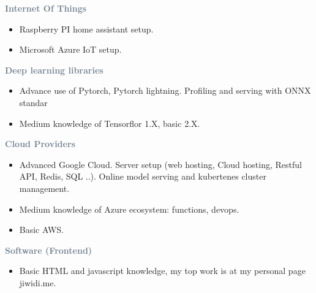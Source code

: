 


\divider


\divider




\textcolor{SlateGrey}{\textbf{Internet Of Things}}
\newline

\begin{itemize}
    \item Raspberry PI home assistant setup.
    \item Microsoft Azure IoT setup.
\end{itemize}

\textcolor{SlateGrey}{\textbf{Deep learning libraries}}
\newline

\begin{itemize}
    \item Advance use of Pytorch, Pytorch lightning. Profiling and serving with ONNX standar
    \item Medium knowledge of Tensorflor 1.X, basic 2.X.
\end{itemize}

\textcolor{SlateGrey}{\textbf{Cloud Providers}}
\newline

\begin{itemize}
    \item Advanced Google Cloud. Server setup (web hosting, Cloud hosting, Restful API, Redis, SQL ..). Online model serving and kubertenes cluster management.
    \item Medium knowledge of Azure ecosystem: functions, devops.
    \item Basic AWS.
\end{itemize}

\textcolor{SlateGrey}{\textbf{Software (Frontend)}}
\newline

\begin{itemize}
    \item Basic HTML and javascript knowledge, my top work is at my personal page jiwidi.me.
\end{itemize}







